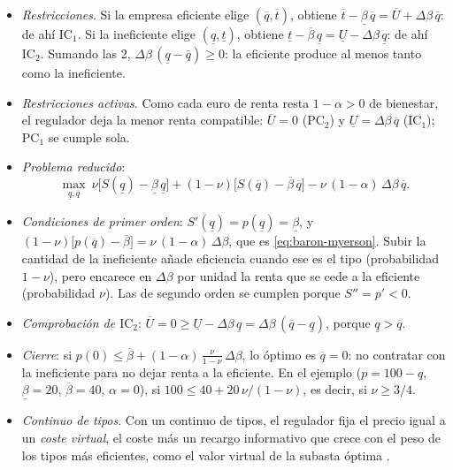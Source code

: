 \documentclass[11pt]{article}
\begin{document}
\begin{itemize}
\item \emph{Restricciones}. Si la empresa eficiente elige $(\overline{q},\overline{t})$, obtiene $\overline{t}-\underline{\beta}\,\overline{q}=\overline{U}+\Delta\beta\,\overline{q}$: de ahí $\mathrm{IC}_1$. Si la ineficiente elige $(\underline{q},\underline{t})$, obtiene $\underline{t}-\overline{\beta}\,\underline{q}=\underline{U}-\Delta\beta\,\underline{q}$: de ahí $\mathrm{IC}_2$. Sumando las 2, $\Delta\beta\,(\underline{q}-\overline{q})\geq 0$: la eficiente produce al menos tanto como la ineficiente.
\item \emph{Restricciones activas}. Como cada euro de renta resta $1-\alpha>0$ de bienestar, el regulador deja la menor renta compatible: $\overline{U}=0$ ($\mathrm{PC}_2$) y $\underline{U}=\Delta\beta\,\overline{q}$ ($\mathrm{IC}_1$); $\mathrm{PC}_1$ se cumple sola.
\item \emph{Problema reducido}:
  \[
  \max_{\underline{q},\overline{q}}\ \nu\big[S(\underline{q})-\underline{\beta}\,\underline{q}\big]+(1-\nu)\big[S(\overline{q})-\overline{\beta}\,\overline{q}\big]-\nu\,(1-\alpha)\,\Delta\beta\,\overline{q}.
  \]
\item \emph{Condiciones de primer orden}: $S'(\underline{q})=p(\underline{q})=\underline{\beta}$, y $(1-\nu)\big[p(\overline{q})-\overline{\beta}\big]=\nu\,(1-\alpha)\,\Delta\beta$, que es \eqref{eq:baron-myerson}. Subir la cantidad de la ineficiente añade eficiencia cuando ese es el tipo (probabilidad $1-\nu$), pero encarece en $\Delta\beta$ por unidad la renta que se cede a la eficiente (probabilidad $\nu$). Las de segundo orden se cumplen porque $S''=p'<0$.
\item \emph{Comprobación de $\mathrm{IC}_2$}: $\overline{U}=0\geq\underline{U}-\Delta\beta\,\underline{q}=\Delta\beta\,(\overline{q}-\underline{q})$, porque $\underline{q}>\overline{q}$.
\item \emph{Cierre}: si $p(0)\leq\overline{\beta}+(1-\alpha)\,\frac{\nu}{1-\nu}\,\Delta\beta$, lo óptimo es $\overline{q}=0$: no contratar con la ineficiente para no dejar renta a la eficiente. En el ejemplo ($p=100-q$, $\underline{\beta}=20$, $\overline{\beta}=40$, $\alpha=0$), si $100\leq 40+20\,\nu/(1-\nu)$, es decir, si $\nu\geq 3/4$.\findemo
\end{itemize}

\begin{itemize}
\item \emph{Continuo de tipos}. Con un continuo de tipos, el regulador fija el precio igual a un \emph{coste virtual}, el coste más un recargo informativo que crece con el peso de los tipos más eficientes\nocite{BaronMyerson1982Regulating}, como el valor virtual de la subasta óptima .
\end{itemize}
\end{document}

